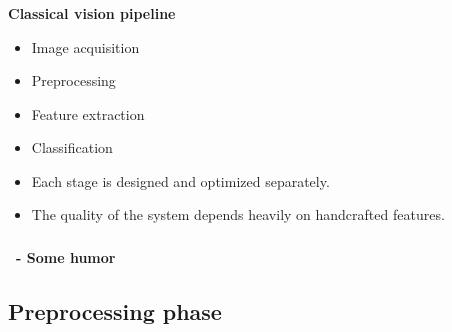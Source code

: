 \documentclass[xcolor=table]{beamer}
\begin{document}
\begin{frame}
	
	\frametitle{\insertshortsubtitle}
	\framesubtitle{\insertsection}
	
	{\Large\bfseries Classical vision pipeline}
	\begin{itemize}
		\item Image acquisition
		\item Preprocessing
		\item Feature extraction
		\item Classification
	\end{itemize}
	
	\vspace{0.5cm}
	
	\begin{itemize}
		\item Each stage is designed and optimized separately.
		\item The quality of the system depends heavily on handcrafted features.
	\end{itemize}
	
\end{frame}

\begin{frame}
	\frametitle{\insertshortsubtitle}
	\framesubtitle{\insertsection\ - Some humor}
	
	
\end{frame}

\subsection{Preprocessing phase}
\end{document}
